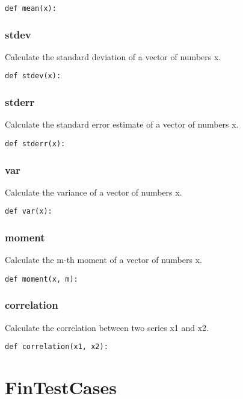 \documentclass[twoside,11pt]{book}
\begin{document}
\begin{lstlisting}
def mean(x):
\end{lstlisting}

\subsubsection*{{\bf stdev}}
Calculate the standard deviation of a vector of numbers x.  

\begin{lstlisting}
def stdev(x):
\end{lstlisting}

\subsubsection*{{\bf stderr}}
Calculate the standard error estimate of a vector of numbers x.  

\begin{lstlisting}
def stderr(x):
\end{lstlisting}

\subsubsection*{{\bf var}}
Calculate the variance of a vector of numbers x.  

\begin{lstlisting}
def var(x):
\end{lstlisting}

\subsubsection*{{\bf moment}}
Calculate the m-th moment of a vector of numbers x.  

\begin{lstlisting}
def moment(x, m):
\end{lstlisting}

\subsubsection*{{\bf correlation}}
Calculate the correlation between two series x1 and x2.  

\begin{lstlisting}
def correlation(x1, x2):
\end{lstlisting}

\newpage
\section{FinTestCases}
\end{document}

